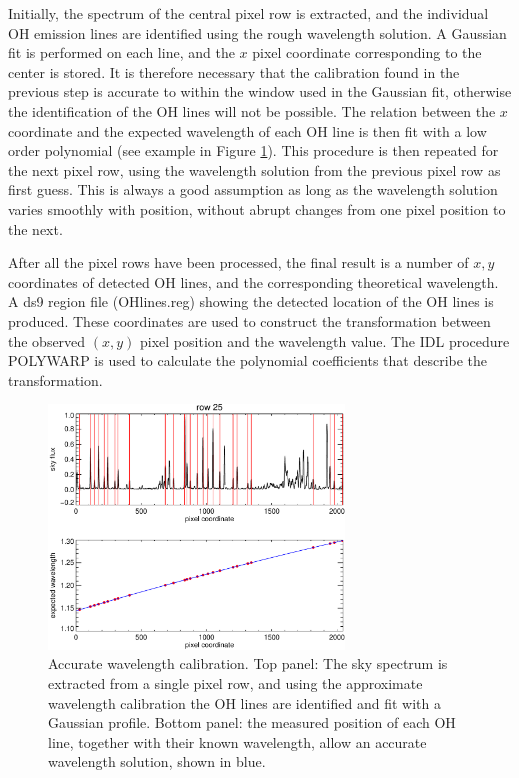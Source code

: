 \documentclass[a4paper, notitlepage]{article}
\begin{document}
Initially, the spectrum of the central pixel row is extracted, and the individual OH emission lines are identified using the rough wavelength solution. A Gaussian fit is performed on each line, and the $x$ pixel coordinate corresponding to the center is stored. It is therefore necessary that the calibration found in the previous step is accurate to within the window used in the Gaussian fit, otherwise the identification of the OH lines will not be possible. The relation between the $x$ coordinate and the expected wavelength of each OH line is then fit with a low order polynomial (see example in Figure \ref{fig:wavecal_accurate}). This procedure is then repeated for the next pixel row, using the wavelength solution from the previous pixel row as first guess. This is always a good assumption as long as the wavelength solution varies smoothly with position, without abrupt changes from one pixel position to the next.

After all the pixel rows have been processed, the final result is a number of $x,y$ coordinates of detected OH lines, and the corresponding theoretical wavelength. A ds9 region file (OHlines.reg) showing the detected location of the OH lines is produced. These coordinates are used to construct the transformation between the observed $(x,y)$ pixel position and the wavelength value. The IDL procedure POLYWARP is used to calculate the polynomial coefficients that describe the transformation.

\begin{figure}[tbp]
\centering
\includegraphics[width=0.7\textwidth]{wavecal_accurate}
\caption{Accurate wavelength calibration. Top panel: The sky spectrum is extracted from a single pixel row, and using the approximate wavelength calibration the OH lines are identified and fit with a Gaussian profile. Bottom panel: the measured position of each OH line, together with their known wavelength, allow an accurate wavelength solution, shown in blue.}
\label{fig:wavecal_accurate}
\end{figure}
\end{document}
